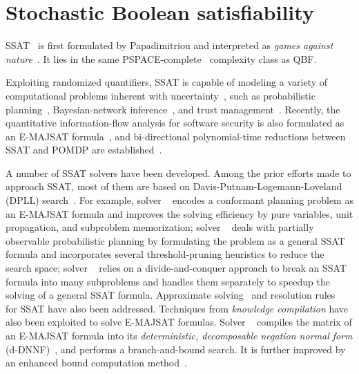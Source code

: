 \section{Stochastic Boolean satisfiability}
\label{sect:related-work-ssat}

SSAT~\cite{Littman2001,SATHandbook-SSAT} is first formulated by Papadimitriou
and interpreted as \textit{games against nature}~\cite{Papadimitriou1985}.
It lies in the same PSPACE-complete~\cite{Stockmeyer1973} complexity class as QBF.

Exploiting randomized quantifiers,
SSAT is capable of modeling a variety of computational problems inherent with uncertainty~\cite{Hnich2011},
such as probabilistic planning~\cite{Kushmerick1995,Littman1998},
Bayesian-network inference~\cite{Cooper1990,Jensen1996,Dechter1998,Bacchus2003},
and trust management~\cite{SATHandbook-SSAT}.
Recently, the quantitative information-flow analysis for software security is also formulated
as an E-MAJSAT formula~\cite{Fremont2017},
and bi-directional polynomial-time reductions between SSAT and POMDP are established~\cite{Salmon2020}.

A number of SSAT solvers have been developed.
Among the prior efforts made to approach SSAT,
most of them are based on Davis-Putnam-Logemann-Loveland (DPLL) search~\cite{Davis1962}.
For example,
solver \maxplan~\cite{Majercik1998} encodes a conformant planning problem as an E-MAJSAT formula
and improves the solving efficiency by pure variables, unit propagation, and subproblem memorization;
solver \zander~\cite{Majercik2003} deals with partially observable probabilistic planning by formulating the problem as a general SSAT formula and incorporates several threshold-pruning heuristics to reduce the search space;
solver \dcssat~\cite{Majercik2005} relies on a divide-and-conquer approach to break an SSAT formula into many subproblems and handles them separately to speedup the solving of a general SSAT formula.
Approximate solving~\cite{Majercik2007} and resolution rules~\cite{Teige2010} for SSAT have also been addressed.
Techniques from \textit{knowledge compilation} have also been exploited to solve E-MAJSAT formulas.
Solver \complan~\cite{Huang2006} compiles the matrix of an E-MAJSAT formula into its
\textit{deterministic, decomposable negation normal form} (d-DNNF)~\cite{Darwiche2001,Darwiche2002dDNNF},
and performs a branch-and-bound search.
It is further improved by an enhanced bound computation method~\cite{Pipatsrisawat2009}.